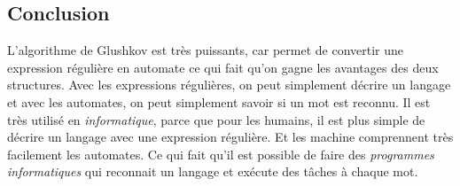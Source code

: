 \subsection{Conclusion}

L'algorithme de Glushkov est très puissants, car permet de convertir une
expression régulière en automate ce qui fait qu'on gagne les avantages des deux
structures. Avec les expressions régulières, on peut simplement décrire un
langage et avec les automates, on peut simplement savoir si un mot est reconnu.
Il est très utilisé en \textit{informatique}, parce que pour les humains, il
est plus simple de décrire un langage avec une expression régulière. Et les
machine comprennent très facilement les automates. Ce qui fait qu'il est
possible de faire des \textit{programmes informatiques} qui reconnait un
langage et exécute des tâches à chaque mot.

